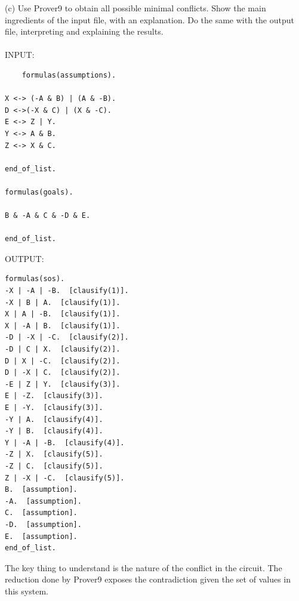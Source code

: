 \documentclass[fullpage]{article}
\begin{document}
(c) Use Prover9 to obtain all possible minimal conflicts. Show the main ingredients of the input file, with an
explanation. Do the same with the output file, interpreting and explaining the results.\\
\\
INPUT:
{\small
\begin{verbatim}
	formulas(assumptions).

X <-> (-A & B) | (A & -B).
D <->(-X & C) | (X & -C).
E <-> Z | Y.
Y <-> A & B.
Z <-> X & C.

end_of_list.

formulas(goals).

B & -A & C & -D & E.

end_of_list.

 \end{verbatim}
}
OUTPUT:
{\small
\begin{verbatim}
formulas(sos).
-X | -A | -B.  [clausify(1)].
-X | B | A.  [clausify(1)].
X | A | -B.  [clausify(1)].
X | -A | B.  [clausify(1)].
-D | -X | -C.  [clausify(2)].
-D | C | X.  [clausify(2)].
D | X | -C.  [clausify(2)].
D | -X | C.  [clausify(2)].
-E | Z | Y.  [clausify(3)].
E | -Z.  [clausify(3)].
E | -Y.  [clausify(3)].
-Y | A.  [clausify(4)].
-Y | B.  [clausify(4)].
Y | -A | -B.  [clausify(4)].
-Z | X.  [clausify(5)].
-Z | C.  [clausify(5)].
Z | -X | -C.  [clausify(5)].
B.  [assumption].
-A.  [assumption].
C.  [assumption].
-D.  [assumption].
E.  [assumption].
end_of_list.
 \end{verbatim}
}
The key thing to understand is the nature of the conflict in the circuit. The reduction done by Prover9  exposes the contradiction given the set of values in this system.\\
 
\end{document}
